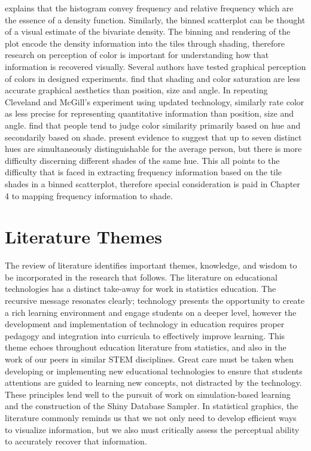 \documentclass[11pt]{isuthesis}\usepackage[]{graphicx}\usepackage[]{color}
\newcommand\chaptocbreak{
	\addtocontents{toc}{\protect\needspace{4\baselineskip}}
	\addtocontents{lof}{\protect\needspace{2\baselineskip}}
	\addtocontents{lot}{\protect\needspace{2\baselineskip}}
}
\begin{document}
\citet{scott1992} explains that the histogram convey frequency and relative frequency which are the essence of a density function. Similarly, the binned scatterplot can be thought of a visual estimate of the bivariate density. The binning and rendering of the plot encode the density information into the tiles through shading, therefore research on perception of color is important for understanding how that information is recovered visually. Several authors have tested graphical perception of colors in designed experiments. \citet{cleveland1984graphical} find that shading and color saturation are less accurate graphical aesthetics than position, size and angle. In repeating Cleveland and McGill's experiment using updated technology, \citet{heer2010crowdsourcing} similarly rate color as less precise for representing quantitative information than position, size and angle. \citet{demiralp2014learning} find that people tend to judge color similarity primarily based on hue and secondarily based on shade. \citet{healey1999large} present evidence to suggest that up to seven distinct hues are simultaneously distinguishable for the average person, but there is more difficulty discerning different shades of the same hue. This all points to the difficulty that is faced in extracting frequency information based on the tile shades in a binned scatterplot, therefore special consideration is paid in Chapter 4 to mapping frequency information to shade.


\section{Literature Themes}

The review of literature identifies important themes, knowledge, and wisdom to be incorporated in the research that follows. The literature on educational technologies has a distinct take-away for work in statistics education. The recursive message resonates clearly; technology presents the opportunity to create a rich learning environment and engage students on a deeper level, however the development and implementation of technology in education requires proper pedagogy and integration into curricula to effectively improve learning. This theme echoes throughout education literature from statistics, and also in the work of our peers in similar STEM disciplines. Great care must be taken when developing or implementing new educational technologies to ensure that students attentions are guided to learning new concepts, not distracted by the technology. These principles lend well to the pursuit of work on simulation-based learning and the construction of the Shiny Database Sampler. In statistical graphics, the literature commonly reminds us that we not only need to develop efficient ways to visualize information, but we also must critically assess the perceptual ability to accurately recover that information. 
 \chaptocbreak
\end{document}
